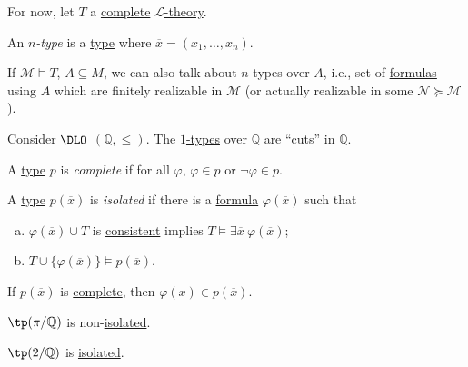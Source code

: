 For now, let \(T\) a \hyperref[def:theory-complete]{complete} \hyperref[def:theory]{\(\mathcal{L} \)-theory}.

\begin{notation}
	An \emph{\(n\)-type} is a \hyperref[def:type]{type} where \(\overline{x} = (x_1, \dots , x_n)\).
\end{notation}

If \(\mathcal{M} \models T\), \(A \subseteq M\), we can also talk about \(n\)-types over \(A\), i.e., set of \hyperref[def:formula]{formulas} using \(A\) which are finitely realizable in \(\mathcal{M} \) (or actually realizable in some \(\mathcal{N} \succeq \mathcal{M} \)).

\begin{eg}
	Consider \(\DLO\) \((\mathbb{Q} , \leq )\). The \hyperref[def:type]{\(1\)-types} over \(\mathbb{Q} \) are ``cuts'' in \(\mathbb{Q} \).
\end{eg}

\begin{definition}[Complete]\label{def:type-complete}
	A \hyperref[def:type]{type} \(p\) is \emph{complete} if for all \(\varphi\), \(\varphi \in p\) or \(\lnot \varphi \in p\).
\end{definition}

\begin{definition}[Isolated]\label{def:isolated}
	A \hyperref[def:type]{type} \(p(\overline{x} )\) is \emph{isolated} if there is a \hyperref[def:formula]{formula} \(\varphi (\overline{x} )\) such that
	\begin{enumerate}[(a)]
		\item \(\varphi (\overline{x} ) \cup T\) is \hyperref[def:consistent]{consistent} implies \(T \models \exists \overline{x} \ \varphi (\overline{x} )\);
		\item \(T \cup \{ \varphi (\overline{x} ) \} \models p(\overline{x} )\).
	\end{enumerate}
\end{definition}

If \(p(\overline{x})\) is \hyperref[def:type-complete]{complete}, then \(\varphi (x) \in p(\overline{x} )\).

\begin{eg}
	\(\tp(\pi / \mathbb{Q} )\) is non-\hyperref[def:isolated]{isolated}.
\end{eg}

\begin{eg}
	\(\tp(2 / \mathbb{Q} )\) is \hyperref[def:isolated]{isolated}.
\end{eg}

